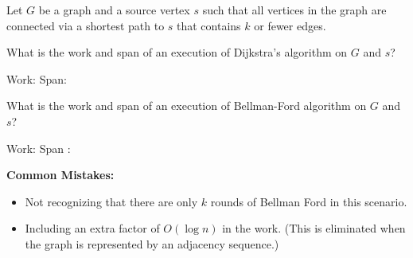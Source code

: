 \begin{problem}

Let $G$ be a graph and a source vertex $s$ such that all vertices in
the graph are connected via a shortest path to $s$ that contains $k$
or fewer edges.

\ask
What is the work and span of an execution of Dijkstra's algorithm on
$G$ and $s$?

\sols 
Work: 
Span: 

\ask
What is the work and span of an execution of Bellman-Ford algorithm on
$G$ and $s$?

\sols
Work: 
Span :  

\notes
\textbf{Common Mistakes:}
\begin{itemize}
	\item Not recognizing that there are only $k$ rounds of Bellman Ford in this
  scenario.

	\item Including an extra factor of $O(\log n)$ in the work. (This is
  eliminated when the graph is represented by an adjacency sequence.)
\end{itemize}
\end{problem}

